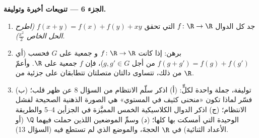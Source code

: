 \begin{problem}[{مسألة نهاية الأسبوع --- $f(x + y) = f(x) + f(y)$:
الانتظام يفرض الخطية، وصورة الوحوش}]
\medskip
\noindent\textbf{الجزء 6 --- تنويعات أخيرة وتوليفة.}
\begin{enumerate}[resume]
  \item جد كل الدوال  $f \colon \R \to \R$ التي تحقق $f(x + y)
        = f(x) + f(y) + xy$ \emph{(اطرح الحل
        الخاص $\frac{x^2}{2}$)}.
  \item برهن: إذا كانت $f \colon \R \to \R$  و
        جمعية على \emph{ } $G$ فحسب (أي
        $f(g + g') = f(g) + f(g')$ من أجل $g, g' \in G$)، فإن $f$
        جمعية على $\R$. وأعمّ من ذلك، تتساوى دالتان متصلتان
        تتطابقان على  جزئية  من $\R$.
  \item توليفة، جملة واحدة لكلٍّ: (أ) اذكر سلّم
        الانتظام من السؤال 8 عن ظهر قلب؛ (ب) فسّر لماذا
        تكون «منحنى كثيف في المستوي» هي الصورة الذهنية
        الصحيحة لفشل الانتظام؛ (ج) اذكر الدوال الكلاسيكية
        الخمس المميَّزة في الجزأين 4--5 والطريقة
        الوحيدة التي أمسكت بها كلها؛ (د) وسمِّ الموضعين
        اللذين حملت فيهما  $\Q$ (أو الأعداد الثنائية) في $\R$
        الحجةَ، والموضع الذي لم تستطع فيه (السؤال 13).
\end{enumerate}
\end{problem}

